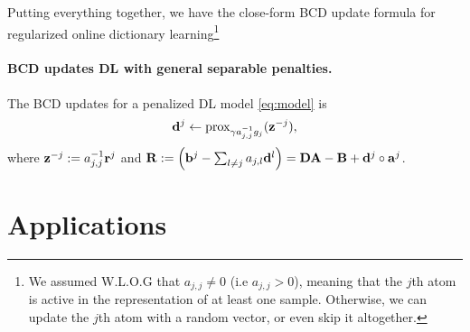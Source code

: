   

Putting everything together, we have the close-form BCD update formula for regularized online dictionary learning\footnote{We assumed W.L.O.G that $a_{j,j} \ne 0$ (i.e $a_{j,j} > 0$), meaning that the $j$th atom is active in the representation of at least one sample. Otherwise, we can update the $j$th atom with a random vector, or even skip it altogether.}
\begin{mdframed}
  \paragraph{BCD updates DL with general separable penalties.}
  The BCD updates for a penalized DL model \eqref{eq:model} is
\begin{equation}
  \mathbf{d}^j \leftarrow \operatorname{prox}_{\gamma a_{j,j}^{-1}g_j}(\mathbf{z}^{-j}),
\end{equation}
where $\mathbf{z}^{-j} := a_{j,j}^{-1}\mathbf{r}^j$ and $\mathbf{R} := \left(\mathbf{b}^j-\sum\nolimits_{l \ne j}a_{j,l}\mathbf{d}^l\right) = \mathbf{DA} - \mathbf{B} + \mathbf{d}^j \circ \mathbf{a}^j $.
\end{mdframed}

\section{Applications}
